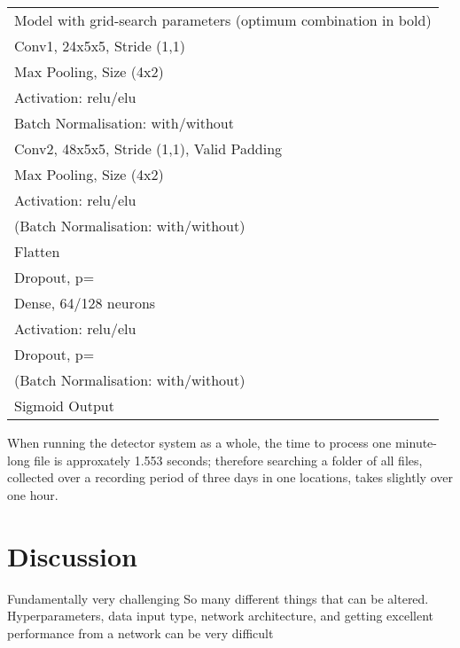 \documentclass[11pt]{article}
\begin{document}
\begin{table}[]
\begin{tabular}{l}
Model with grid-search parameters (optimum combination in bold) \\
Conv1, 24x5x5, Stride (1,1)                                     \\
Max Pooling, Size (4x2)                                         \\
Activation: relu/elu                                            \\
Batch Normalisation: with/without                               \\
Conv2, 48x5x5, Stride (1,1), Valid Padding                      \\
Max Pooling, Size (4x2)                                         \\
Activation: relu/elu                                            \\
(Batch Normalisation: with/without)                             \\
Flatten                                                         \\
Dropout, p=                                                     \\
Dense, 64/128 neurons                                           \\
Activation: relu/elu                                            \\
Dropout, p=                                                     \\
(Batch Normalisation: with/without)                             \\
Sigmoid Output                                                 
\end{tabular}
\end{table}

When running the detector system as a whole, the time to process one minute-long file is approxately 1.553 seconds; therefore searching a folder of all files, collected over a recording period of three days in one locations, takes slightly over one hour.  

\section{Discussion}

Fundamentally very challenging 
So many different things that can be altered. Hyperparameters, data input type, network architecture, and getting excellent performance from a network can be very difficult
\end{document}
